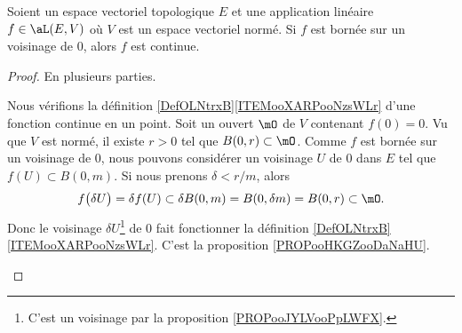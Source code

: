 \begin{proposition}	\label{PROPooHUWQooPWYBUu}
	Soient un espace vectoriel topologique \( E\) et une application linéaire \( f\in\aL(E,V)\) où \( V\) est un espace vectoriel normé. Si \( f\) est bornée sur un voisinage de \( 0\), alors \( f\) est continue.
\end{proposition}

\begin{proof}
	En plusieurs parties.
	\begin{subproof}
		Nous vérifions la définition \ref{DefOLNtrxB}\ref{ITEMooXARPooNzsWLr} d'une fonction continue en un point. Soit un ouvert \( \mO\) de \( V\) contenant \( f(0)=0\). Vu que \( V\) est normé, il existe \( r>0\) tel que \( B(0,r)\subset\mO\). Comme \( f\) est bornée sur un voisinage de \( 0\), nous pouvons considérer un voisinage \( U\) de \( 0\) dans \( E\) tel que \( f(U)\subset B(0,m)\). Si nous prenons \(\delta<r/m\), alors
		\begin{equation}
			f\big( \delta U \big)=\delta f(U)\subset \delta B(0,m)=B(0,\delta m)=B(0,r)\subset \mO.
		\end{equation}
		Donc le voisinage \( \delta U\)\footnote{C'est un voisinage par la proposition \ref{PROPooJYLVooPpLWFX}.} de \( 0\) fait fonctionner la définition \ref{DefOLNtrxB}\ref{ITEMooXARPooNzsWLr}.
		C'est la proposition \ref{PROPooHKGZooDaNaHU}.
	\end{subproof}
\end{proof}
